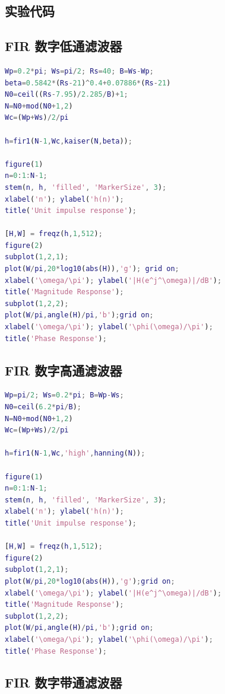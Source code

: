 \documentclass[12pt,AutoFakeBold]{article}
\begin{document}
\newpage
\begin{appendices}  %
\section{实验代码}

\subsection{FIR 数字低通滤波器}

\begin{lstlisting}[language=Matlab]
% Low-pass filter
Wp=0.2*pi; Ws=pi/2; Rs=40; B=Ws-Wp;
beta=0.5842*(Rs-21)^0.4+0.07886*(Rs-21)
N0=ceil((Rs-7.95)/2.285/B)+1;
N=N0+mod(N0+1,2)
Wc=(Wp+Ws)/2/pi

h=fir1(N-1,Wc,kaiser(N,beta));

figure(1)
n=0:1:N-1;
stem(n, h, 'filled', 'MarkerSize', 3);
xlabel('n'); ylabel('h(n)');
title('Unit impulse response');

[H,W] = freqz(h,1,512);
figure(2)
subplot(1,2,1);
plot(W/pi,20*log10(abs(H)),'g'); grid on;
xlabel('\omega/\pi'); ylabel('|H(e^j^\omega)|/dB');
title('Magnitude Response');
subplot(1,2,2);
plot(W/pi,angle(H)/pi,'b');grid on;
xlabel('\omega/\pi'); ylabel('\phi(\omega)/\pi');
title('Phase Response');
\end{lstlisting}

\subsection{FIR 数字高通滤波器}

\begin{lstlisting}[language=Matlab]
% High-pass filter
Wp=pi/2; Ws=0.2*pi; B=Wp-Ws;
N0=ceil(6.2*pi/B);
N=N0+mod(N0+1,2)
Wc=(Wp+Ws)/2/pi

h=fir1(N-1,Wc,'high',hanning(N));

figure(1)
n=0:1:N-1;
stem(n, h, 'filled', 'MarkerSize', 3);
xlabel('n'); ylabel('h(n)');
title('Unit impulse response');

[H,W] = freqz(h,1,512);
figure(2)
subplot(1,2,1);
plot(W/pi,20*log10(abs(H)),'g');grid on;
xlabel('\omega/\pi'); ylabel('|H(e^j^\omega)|/dB');
title('Magnitude Response');
subplot(1,2,2);
plot(W/pi,angle(H)/pi,'b');grid on;
xlabel('\omega/\pi'); ylabel('\phi(\omega)/\pi');
title('Phase Response');
\end{lstlisting}

\subsection{FIR 数字带通滤波器}


\end{appendices}
\end{document}

